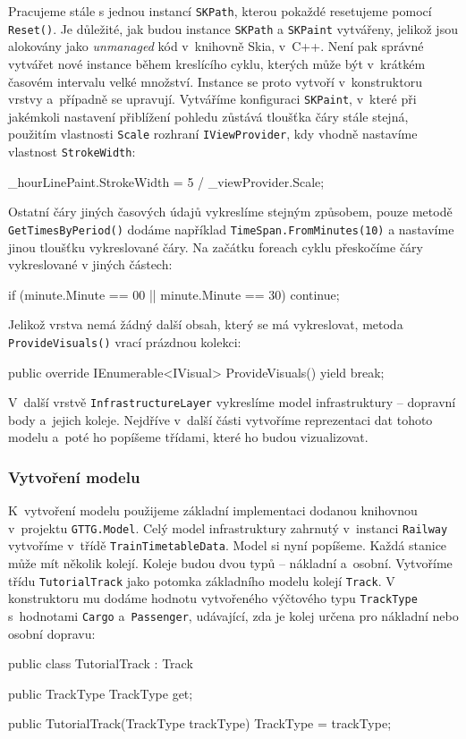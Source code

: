 Pracujeme stále s jednou instancí \texttt{SKPath}, kterou pokaždé resetujeme pomocí \texttt{Reset()}. Je důležité, jak budou instance \texttt{SKPath} a \texttt{SKPaint}  vytvářeny, jelikož jsou alokovány jako \textit{unmanaged} kód v~knihovně Skia, v~C++. Není pak správné vytvářet nové instance během kreslícího cyklu, kterých může být v~krátkém časovém intervalu velké množství. Instance se proto vytvoří v~konstruktoru vrstvy a~případně se upravují. Vytváříme konfiguraci \texttt{SKPaint}, v~které při jakémkoli nastavení přiblížení pohledu zůstává tloušťka čáry stále stejná, použitím vlastnosti \texttt{Scale} rozhraní \texttt{IViewProvider}, kdy vhodně nastavíme vlastnost \texttt{StrokeWidth}:
\begin{csharpcode}
_hourLinePaint.StrokeWidth = 5 / _viewProvider.Scale;
\end{csharpcode}

Ostatní čáry jiných časových údajů vykreslíme stejným způsobem, pouze metodě \texttt{GetTimesByPeriod()} dodáme například \texttt{TimeSpan.FromMinutes(10)} a nastavíme jinou tloušťku vykreslované čáry. Na začátku foreach cyklu přeskočíme čáry vykreslované v jiných částech:

\begin{csharpcode}
if (minute.Minute == 00 || minute.Minute == 30) {
   continue;
}
\end{csharpcode}

Jelikož vrstva nemá žádný další obsah, který se má vykreslovat, metoda \texttt{ProvideVisuals()} vrací prázdnou kolekci:

\begin{csharpcode}
public override IEnumerable<IVisual> ProvideVisuals() {
	yield break;
}
\end{csharpcode} 

V~další vrstvě \texttt{InfrastructureLayer} vykreslíme model infrastruktury -- dopravní body a~jejich koleje. Nejdříve v~další části vytvoříme reprezentaci dat tohoto modelu a~poté ho popíšeme třídami, které ho budou vizualizovat.

\subsubsection*{Vytvoření modelu}
K~vytvoření modelu použijeme základní implementaci dodanou knihovnou v~projektu \texttt{GTTG.Model}. Celý model infrastruktury zahrnutý v~instanci \texttt{Railway}  vytvoříme v~třídě \texttt{TrainTimetableData}. Model si nyní popíšeme. Každá stanice může mít několik kolejí. Koleje budou dvou typů -- nákladní a~osobní. Vytvoříme třídu \texttt{TutorialTrack} jako potomka základního modelu kolejí \texttt{Track}. V konstruktoru mu dodáme hodnotu vytvořeného výčtového typu \texttt{TrackType} s~hodnotami \texttt{Cargo} a~\texttt{Passenger}, udávající, zda je kolej určena pro nákladní nebo osobní dopravu:
\newpage
\begin{csharpcode}
public class TutorialTrack : Track {

	public TrackType TrackType { get; }

	public TutorialTrack(TrackType trackType) {
		TrackType = trackType;
	}
}
\end{csharpcode}

